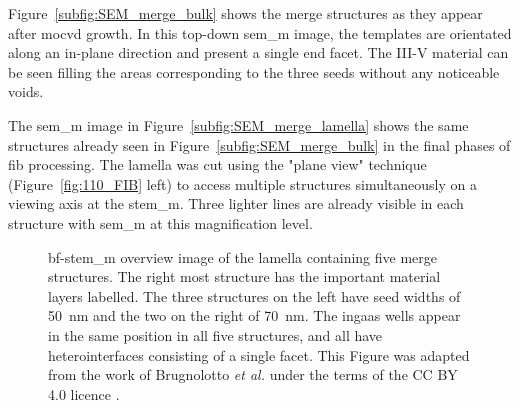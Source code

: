 Figure~\ref{subfig:SEM_merge_bulk} shows the merge structures as they appear after \acs{mocvd} growth. In this top-down \acs{sem_m} image, the templates are orientated along an in-plane  direction and present a single  end facet. The III-V material can be seen filling the areas corresponding to the three seeds without any noticeable voids. 

The \acs{sem_m} image in Figure~\ref{subfig:SEM_merge_lamella} shows the same structures already seen in Figure~\ref{subfig:SEM_merge_bulk} in the final phases of \acs{fib} processing. The lamella was cut using the "plane view" technique (Figure~\ref{fig:110_FIB} left) to access multiple structures simultaneously on a  viewing axis at the \acs{stem_m}. Three lighter lines are already visible in each structure with \acs{sem_m} at this magnification level.

\begin{figure}
    \centering
    \caption[\acs{bf}-\acs{stem_m} overview image of the lamella containing five merge structures.]{\acs{bf}-\acs{stem_m} overview image of the lamella containing five merge structures. The right most structure has the important material layers labelled. The three structures on the left have seed widths of \qty{50}{\nano\metre} and the two on the right of \qty{70}{\nano\metre}. The \acs{ingaas} wells appear in the same position in all five structures, and all have heterointerfaces consisting of a single  facet. This Figure was adapted from the work of Brugnolotto \textit{et al.} \cite{Brugnolotto2023_2} under the terms of the CC BY 4.0 licence \cite{CCBY40}.}
    \label{fig:merge_ov}
\end{figure}

